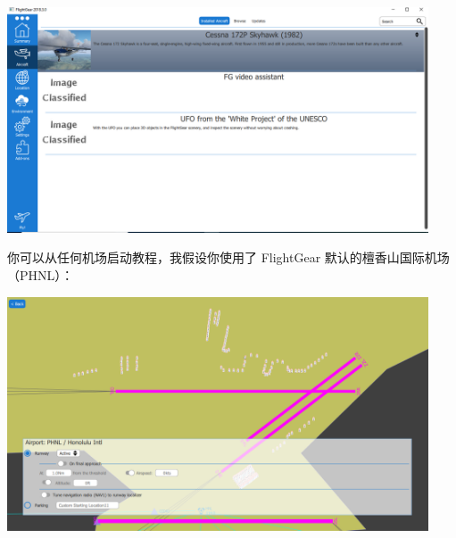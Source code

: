\medskip

\centerline{
  \includegraphics[clip,width=12.5cm]{img/basic_tutorial/launcher-1}
}
\medskip

\ifchinese
你可以从任何机场启动教程，我假设你使用了 FlightGear 默认的檀香山国际机场（PHNL）：
\fi

{}
\medskip

\centerline{
  \includegraphics[clip,width=12.5cm]{img/basic_tutorial/launcher-2}
}
\newpage

